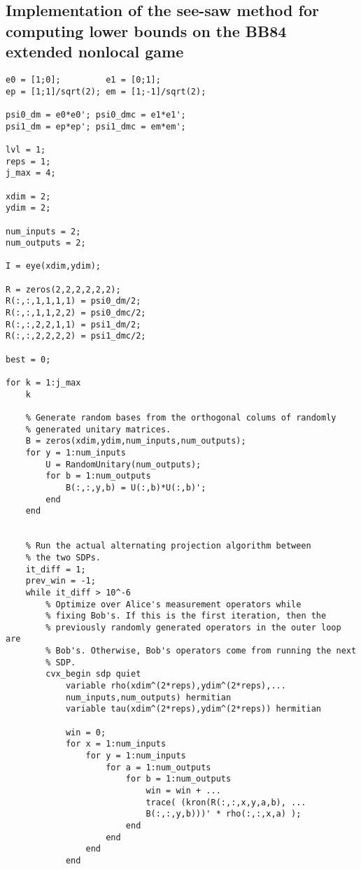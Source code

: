 \subsection{Implementation of the see-saw method for computing lower bounds on the BB84 extended nonlocal game} \label{code:bb84-enlg-lower-bound}

\begin{verbatim}
e0 = [1;0];         e1 = [0;1];
ep = [1;1]/sqrt(2); em = [1;-1]/sqrt(2);

psi0_dm = e0*e0'; psi0_dmc = e1*e1';
psi1_dm = ep*ep'; psi1_dmc = em*em';

lvl = 1;
reps = 1;    
j_max = 4;

xdim = 2;
ydim = 2;

num_inputs = 2;
num_outputs = 2;

I = eye(xdim,ydim);

R = zeros(2,2,2,2,2,2);
R(:,:,1,1,1,1) = psi0_dm/2;
R(:,:,1,1,2,2) = psi0_dmc/2;
R(:,:,2,2,1,1) = psi1_dm/2;
R(:,:,2,2,2,2) = psi1_dmc/2; 

best = 0;
    
for k = 1:j_max
    k
    
    % Generate random bases from the orthogonal colums of randomly 
    % generated unitary matrices.     
    B = zeros(xdim,ydim,num_inputs,num_outputs);
    for y = 1:num_inputs
        U = RandomUnitary(num_outputs);
        for b = 1:num_outputs
            B(:,:,y,b) = U(:,b)*U(:,b)';
        end
    end  


    % Run the actual alternating projection algorithm between
    % the two SDPs. 
    it_diff = 1;
    prev_win = -1;
    while it_diff > 10^-6
        % Optimize over Alice's measurement operators while
        % fixing Bob's. If this is the first iteration, then the 
        % previously randomly generated operators in the outer loop are
        % Bob's. Otherwise, Bob's operators come from running the next
        % SDP.
        cvx_begin sdp quiet                
            variable rho(xdim^(2*reps),ydim^(2*reps),...
            num_inputs,num_outputs) hermitian
            variable tau(xdim^(2*reps),ydim^(2*reps)) hermitian

            win = 0;
            for x = 1:num_inputs
                for y = 1:num_inputs
                    for a = 1:num_outputs
                        for b = 1:num_outputs                               
                            win = win + ...                            
                           	trace( (kron(R(:,:,x,y,a,b), ...
                           	B(:,:,y,b)))' * rho(:,:,x,a) );                                
                        end
                    end
                end
            end
            

\end{verbatim}
